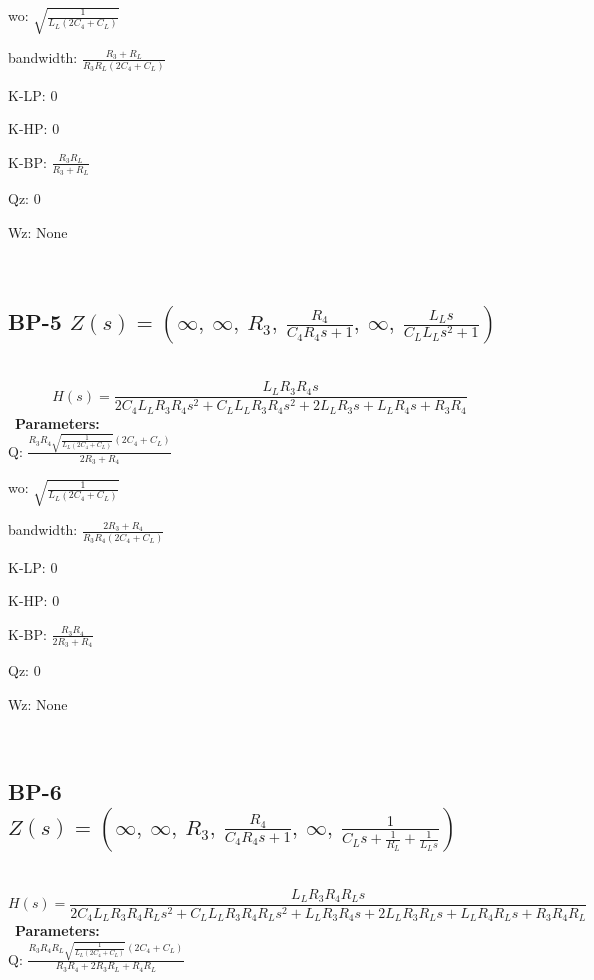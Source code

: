 \documentclass{article}
\begin{document}
wo: $\sqrt{\frac{1}{L_{L} \left(2 C_{4} + C_{L}\right)}}$\ 

bandwidth: $\frac{R_{3} + R_{L}}{R_{3} R_{L} \left(2 C_{4} + C_{L}\right)}$\ 

K-LP: $0$\ 

K-HP: $0$\ 

K-BP: $\frac{R_{3} R_{L}}{R_{3} + R_{L}}$\ 

Qz: $0$\ 

Wz: $\text{None}$\ 

\ 

\subsection{BP-5 $Z(s) = \left( \infty, \  \infty, \  R_{3}, \  \frac{R_{4}}{C_{4} R_{4} s + 1}, \  \infty, \  \frac{L_{L} s}{C_{L} L_{L} s^{2} + 1}\right)$ } \ 
\textbf{\[H(s) = \frac{L_{L} R_{3} R_{4} s}{2 C_{4} L_{L} R_{3} R_{4} s^{2} + C_{L} L_{L} R_{3} R_{4} s^{2} + 2 L_{L} R_{3} s + L_{L} R_{4} s + R_{3} R_{4}}\] } \ 
\textbf{Parameters:}\\ 

Q: $\frac{R_{3} R_{4} \sqrt{\frac{1}{L_{L} \left(2 C_{4} + C_{L}\right)}} \left(2 C_{4} + C_{L}\right)}{2 R_{3} + R_{4}}$\ 

wo: $\sqrt{\frac{1}{L_{L} \left(2 C_{4} + C_{L}\right)}}$\ 

bandwidth: $\frac{2 R_{3} + R_{4}}{R_{3} R_{4} \left(2 C_{4} + C_{L}\right)}$\ 

K-LP: $0$\ 

K-HP: $0$\ 

K-BP: $\frac{R_{3} R_{4}}{2 R_{3} + R_{4}}$\ 

Qz: $0$\ 

Wz: $\text{None}$\ 

\ 

\subsection{BP-6 $Z(s) = \left( \infty, \  \infty, \  R_{3}, \  \frac{R_{4}}{C_{4} R_{4} s + 1}, \  \infty, \  \frac{1}{C_{L} s + \frac{1}{R_{L}} + \frac{1}{L_{L} s}}\right)$ } \ 
\textbf{\[H(s) = \frac{L_{L} R_{3} R_{4} R_{L} s}{2 C_{4} L_{L} R_{3} R_{4} R_{L} s^{2} + C_{L} L_{L} R_{3} R_{4} R_{L} s^{2} + L_{L} R_{3} R_{4} s + 2 L_{L} R_{3} R_{L} s + L_{L} R_{4} R_{L} s + R_{3} R_{4} R_{L}}\] } \ 
\textbf{Parameters:}\\ 

Q: $\frac{R_{3} R_{4} R_{L} \sqrt{\frac{1}{L_{L} \left(2 C_{4} + C_{L}\right)}} \left(2 C_{4} + C_{L}\right)}{R_{3} R_{4} + 2 R_{3} R_{L} + R_{4} R_{L}}$\ 
\end{document}
